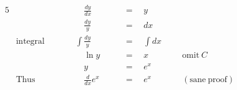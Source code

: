 \begin{alignat*}{5}
&\,&&\quad\frac{dy}{dx}\quad&&\,=\quad y\\
&\,&&\quad\frac{dy}{y}\quad&&\,=\quad dx\\
&\mathrm{integral}\qquad&&\int\frac{dy}{y}\quad&&\,=\quad \int{dx}\\
&\,&&\quad\ln{y}\quad&&\,=\quad x\qquad&&\mathrm{omit}~C\\
&\,&&\quad y\quad&&\,=\quad e^x\\
&\mathrm{Thus}&&\quad\frac{d}{dx}e^x\quad&&\,=\quad e^x\qquad&&\mathrm{(sane~proof)}
\end{alignat*}

